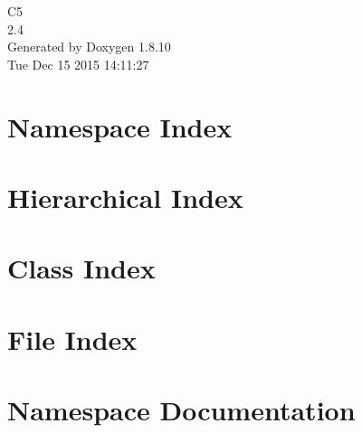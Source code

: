 \documentclass[twoside]{book}
\newcommand{\+}{\discretionary{\mbox{\scriptsize$\hookleftarrow$}}{}{}}
\newcommand{\clearemptydoublepage}{%
  \newpage{\pagestyle{empty}\cleardoublepage}%
}
\begin{document}
\hypersetup{pageanchor=false,
             bookmarks=true,
             bookmarksnumbered=true,
             pdfencoding=unicode
            }
\begin{titlepage}
\vspace*{7cm}
\begin{center}%
{\Large C5 \\[1ex]\large 2.\+4 }\\
\vspace*{1cm}
{\large Generated by Doxygen 1.8.10}\\
\vspace*{0.5cm}
{\small Tue Dec 15 2015 14:11:27}\\
\end{center}
\end{titlepage}
\clearemptydoublepage
\tableofcontents
\clearemptydoublepage
{}
\hypersetup{pageanchor=true}

\chapter{Namespace Index}

\chapter{Hierarchical Index}

\chapter{Class Index}

\chapter{File Index}

\chapter{Namespace Documentation}

\end{document}
